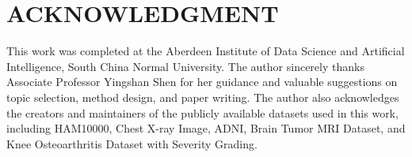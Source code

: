 \documentclass[letterpaper, 10 pt, conference]{ieeeconf}  %
\begin{document}







\section*{ACKNOWLEDGMENT}

This work was completed at the Aberdeen Institute of Data Science and Artificial Intelligence, South China Normal University. The author sincerely thanks Associate Professor Yingshan Shen for her guidance and valuable suggestions on topic selection, method design, and paper writing. The author also acknowledges the creators and maintainers of the publicly available datasets used in this work, including HAM10000, Chest X-ray Image, ADNI, Brain Tumor MRI Dataset, and Knee Osteoarthritis Dataset with Severity Grading.



\end{document}
